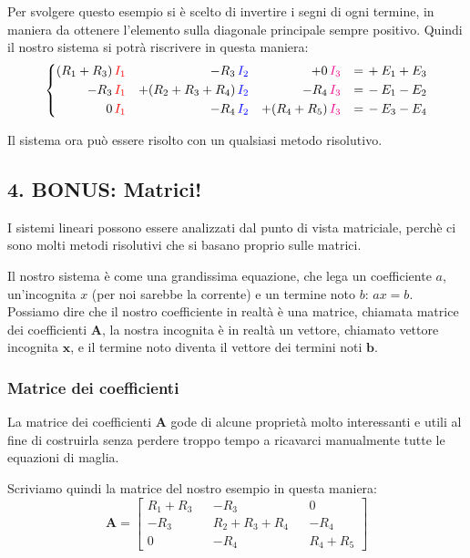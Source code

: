 Per svolgere questo esempio si è scelto di invertire i segni di ogni termine, in maniera da ottenere l'elemento sulla diagonale principale sempre positivo.
Quindi il nostro sistema si potrà riscrivere in questa maniera:
\begin{equation}
    \left\{
    \begin{aligned}
        (R_1 + R_3)\, & \textcolor{red}{I_1} & - R_3\,               & \textcolor{blue}{I_2} & + 0\,           & \textcolor{magenta}{I_3} & = & \, + E_1 + E_3 \\
        - R_3\,       & \textcolor{red}{I_1} & + (R_2 + R_3 + R_4)\, & \textcolor{blue}{I_2} & - R_4\,         & \textcolor{magenta}{I_3} & = & \, - E_1 - E_2 \\
        0\,           & \textcolor{red}{I_1} & - R_4\,               & \textcolor{blue}{I_2} & + (R_4 + R_5)\, & \textcolor{magenta}{I_3} & = & \, - E_3 - E_4
    \end{aligned}
    \right.
\end{equation}


Il sistema ora può essere risolto con un qualsiasi metodo risolutivo.

\subsection*{4. BONUS: Matrici!}

I sistemi lineari possono essere analizzati dal punto di vista matriciale, perchè ci sono molti metodi risolutivi che si basano proprio sulle matrici.

Il nostro sistema è come una grandissima equazione, che lega un coefficiente $a$, un'incognita $x$ (per noi sarebbe la corrente) e un termine noto $b$: $ax = b$. Possiamo dire che il nostro coefficiente in realtà è una matrice, chiamata matrice dei coefficienti $\mathbf{A}$, la nostra incognita è in realtà un vettore, chiamato vettore incognita $\mathbf{x}$, e il termine noto diventa il vettore dei termini noti $\mathbf{b}$.

\subsubsection*{Matrice dei coefficienti}

La matrice dei coefficienti $\mathbf{A}$ gode di alcune proprietà molto interessanti e utili al fine di costruirla senza perdere troppo tempo a ricavarci manualmente tutte le equazioni di maglia.

Scriviamo quindi la matrice del nostro esempio in questa maniera:
\begin{equation}
    \mathbf{A} = 
    \begin{bmatrix}
        R_1+R_3 &  & -R_3        &  & 0       \\
        -R_3    &  & R_2+R_3+R_4 &  & -R_4    \\
        0       &  & -R_4        &  & R_4+R_5
    \end{bmatrix}
\end{equation}

